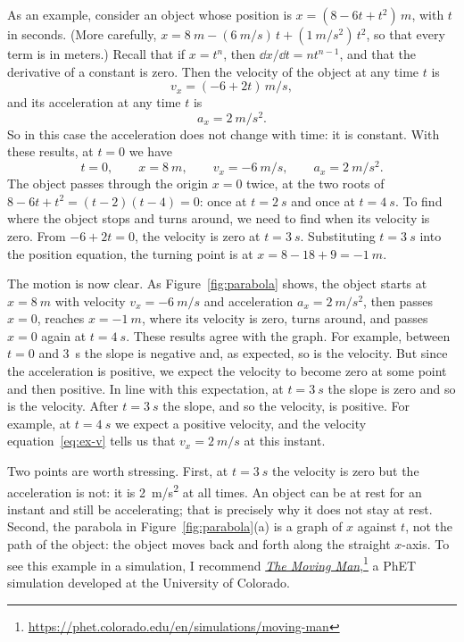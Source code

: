 \documentclass[11pt,a4paper]{article}
\begin{document}
As an example, consider an object whose position is $x = (8 - 6t + t^2)\,\unit{m}$, with $t$ in seconds.
(More carefully, $x = \qty{8}{m} - (\qty{6}{m/s})\,t + (\qty{1}{m/s^2})\,t^2$, so that every term
is in meters.) Recall that if $x = t^n$, then $\dd x/\dd t = nt^{n-1}$, and that the derivative of
a constant is zero. Then the velocity of the object at any time $t$ is
\begin{equation}\label{eq:ex-v}
  v_x = (-6 + 2t)\,\unit{m/s} ,
\end{equation}
and its acceleration at any time $t$ is
\begin{equation}\label{eq:ex-a}
  a_x = \qty{2}{m/s^2} .
\end{equation}
So in this case the acceleration does not change with time: it is constant. With these results, at
$t = 0$ we have
\begin{equation}\label{eq:ex-t0}
  t = 0 , \qquad x = \qty{+8}{m} , \qquad v_x = \qty{-6}{m/s} , \qquad a_x = \qty{2}{m/s^2} .
\end{equation}
The object passes through the origin $x = 0$ twice, at the two roots of
$8 - 6t + t^2 = (t-2)(t-4) = 0$: once at $t = \qty{2}{s}$ and once at $t = \qty{4}{s}$. To find
where the object stops and turns around, we need to find when its velocity is zero. From
$-6 + 2t = 0$, the velocity is zero at $t = \qty{3}{s}$. Substituting $t = \qty{3}{s}$ into the
position equation, the turning point is at $x = 8 - 18 + 9 = \qty{-1}{m}$.

The motion is now clear. As Figure~\ref{fig:parabola} shows, the object starts at $x = \qty{8}{m}$
with velocity $v_x = \qty{-6}{m/s}$ and acceleration $a_x = \qty{2}{m/s^2}$, then passes $x = 0$,
reaches $x = \qty{-1}{m}$, where its velocity is zero, turns around, and passes $x = 0$ again at
$t = \qty{4}{s}$. These results agree with the graph. For example, between $t = 0$ and
\qty{3}{s} the slope is negative and, as expected, so is the velocity. But since the acceleration
is positive, we expect the velocity to become zero at some point and then positive. In line with
this expectation, at $t = \qty{3}{s}$ the slope is zero and so is the velocity. After
$t = \qty{3}{s}$ the slope, and so the velocity, is positive. For example, at $t = \qty{4}{s}$ we
expect a positive velocity, and the velocity equation~\eqref{eq:ex-v} tells us that
$v_x = \qty{+2}{m/s}$ at this instant.

Two points are worth stressing. First, at $t = \qty{3}{s}$ the velocity is zero but the
acceleration is not: it is \qty{2}{m/s^2} at all times. An object can be at rest for an instant and
still be accelerating; that is precisely why it does not stay at rest. Second, the parabola in
Figure~\ref{fig:parabola}(a) is a graph of $x$ against $t$, not the path of the object: the object
moves back and forth along the straight $x$-axis. To see this example in a simulation, I recommend
\href{https://phet.colorado.edu/en/simulations/moving-man}{\emph{The Moving Man}},\footnote{\url{https://phet.colorado.edu/en/simulations/moving-man}}
a PhET simulation developed at the University of Colorado.
\end{document}
